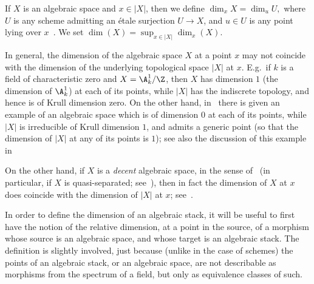 \begin{adf}
\label{def:dimension for algebraic spaces}
If $X$ is an algebraic space and $x \in |X|$,
then we define $\dim_x X = \dim_u U,$ where $U$ is any scheme
admitting an \'etale surjection $U \to X$,
and $u\in U$ is any point lying over
$x$~\cite[\href{http://stacks.math.columbia.edu/tag/04N5}{Def.~04N5}]
{stacks-project}. We set $\dim(X) = \sup_{x \in |X|}
\dim_x(X)$.
\end{adf}

\begin{aremark}
In general, the dimension of the algebraic space $X$ at a point $x$
may not coincide with the dimension of the underlying topological space
$|X|$ at $x$.  E.g.\ if $k$ is a field of characteristic zero and
$X =  \A^1_k / \Z$, then $X$ has dimension $1$ (the dimension
of $\A^1_k$) at each of its points,
while $|X|$ has the indiscrete topology, and hence is of Krull
dimension zero.   On the other hand,
in~\cite[\href{http://stacks.math.columbia.edu/tag/02Z8}{Ex.~02Z8}]
{stacks-project} 
there is given an example of an algebraic space
which is of dimension $0$ at each of its points, while $|X|$ is
irreducible of Krull dimension $1$, and admits a generic point (so that the
dimension of $|X|$ at any of its points is $1$); see also the discussion
of this example 
in~\cite[\href{http://stacks.math.columbia.edu/tag/04N3}{Tag~04N3}]
{stacks-project} 

On the other hand, if $X$ is a {\em decent} algebraic space, in the sense
of~\cite[\href{http://stacks.math.columbia.edu/tag/03I8}{Def.~03I8}]
{stacks-project}
(in particular, if $X$ is quasi-separated;
see~\cite[\href{http://stacks.math.columbia.edu/tag/03I7}{Def.~03I7}]
{stacks-project}),
then in fact the dimension of $X$ at $x$ does coincide with the dimension
of $|X|$ at $x$;
see~\cite[\href{http://stacks.math.columbia.edu/tag/0A4J}{Lem.~0A4J}]
{stacks-project}.
\end{aremark}

In order to  define the dimension of an algebraic stack,
it will be useful to first have the notion of the relative dimension,
at a point in the source, 
of a morphism whose source is an algebraic space,
and whose target is an algebraic stack.  The definition is slightly
involved, just because (unlike in the case of schemes) the points of an algebraic stack, or an algebraic
space, are not describable as morphisms from the spectrum of a field, but only as equivalence classes of such.

